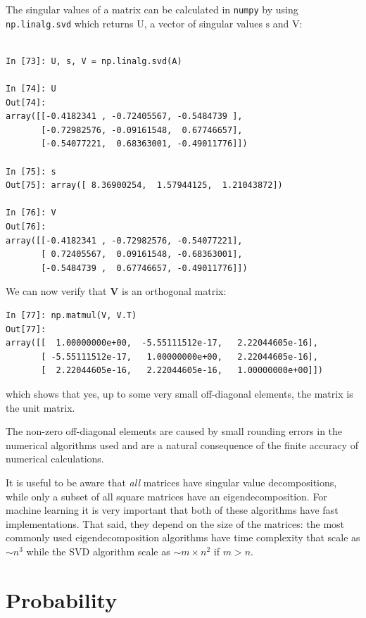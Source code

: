 \documentclass[a4paper,10pt]{article}
\begin{document}
The singular values of a matrix can be calculated in \texttt{numpy} by using \texttt{np.linalg.svd} which returns $\mathrm{U}$, a vector of singular values $\mathrm{s}$ and $\mathrm{V}$:

\begin{lstlisting}

In [73]: U, s, V = np.linalg.svd(A)

In [74]: U
Out[74]: 
array([[-0.4182341 , -0.72405567, -0.5484739 ],
       [-0.72982576, -0.09161548,  0.67746657],
       [-0.54077221,  0.68363001, -0.49011776]])

In [75]: s
Out[75]: array([ 8.36900254,  1.57944125,  1.21043872])

In [76]: V
Out[76]: 
array([[-0.4182341 , -0.72982576, -0.54077221],
       [ 0.72405567,  0.09161548, -0.68363001],
       [-0.5484739 ,  0.67746657, -0.49011776]])
\end{lstlisting}


We can now verify that $\mathbf{V}$ is an orthogonal matrix:

\begin{lstlisting}
In [77]: np.matmul(V, V.T)
Out[77]: 
array([[  1.00000000e+00,  -5.55111512e-17,   2.22044605e-16],
       [ -5.55111512e-17,   1.00000000e+00,   2.22044605e-16],
       [  2.22044605e-16,   2.22044605e-16,   1.00000000e+00]])

\end{lstlisting}

which shows that yes, up to some very small off-diagonal elements, the matrix is the unit matrix.

The non-zero off-diagonal elements are caused by small rounding errors in the numerical algorithms used and are a natural consequence of the finite accuracy of numerical calculations.

It is useful to be aware that \emph{all} matrices have singular value decompositions, while only a subset of all square matrices have an eigendecomposition. For machine learning it is very important that both of these algorithms have fast implementations.  That said, they depend on the size of the matrices: the most commonly used eigendecomposition algorithms have time complexity that scale as $\sim n^3$ while the SVD algorithm scale as $\sim m\times n^2$ if $m>n$.



\section{ Probability}
\end{document}
